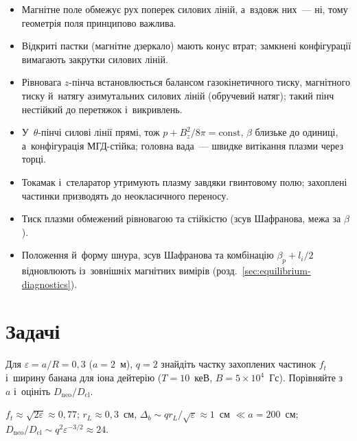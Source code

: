\begin{Summary}
\begin{itemize}
\item Магнітне поле обмежує рух поперек силових ліній, а~вздовж них~--- ні, тому геометрія поля принципово важлива.
\item Відкриті пастки (магнітне дзеркало) мають конус втрат; замкнені конфігурації вимагають закрутки силових ліній.
\item Рівновага $z$-пінча встановлюється балансом газокінетичного тиску, магнітного тиску й~натягу азимутальних силових ліній (обручевий натяг); такий пінч нестійкий до перетяжок і~викривлень.
\item У~$\theta$-пінчі силові лінії прямі, тож $p+B_z^2/8\pi=\mathrm{const}$, $\beta$ близьке до одиниці, а~конфігурація МГД-стійка; головна вада~--- швидке витікання плазми через торці.
\item Токамак і~стеларатор утримують плазму завдяки гвинтовому полю; захоплені частинки призводять до неокласичного переносу.
\item Тиск плазми обмежений рівновагою та стійкістю (зсув Шафранова, межа за $\beta$).
\item Положення й~форму шнура, зсув Шафранова та комбінацію $\beta_p+l_i/2$ відновлюють із~зовнішніх магнітних вимірів (розд.~\ref{sec:equilibrium-diagnostics}).
\end{itemize}
\end{Summary}

\section*{Задачі}

\begin{problem}\label{prb:BananaWidth}
	Для $\varepsilon=a/R=0{,}3$ ($a=2$~м), $q=2$ знайдіть частку захоплених частинок $f_t$ і~ширину банана
	для іона дейтерію ($T=10$~кеВ, $B=5\times10^4$~Гс). Порівняйте з~$a$ і~оцініть
	$D_\mathrm{neo}/D_\mathrm{cl}$.
	\begin{solution}
		$f_t\approx\sqrt{2\varepsilon}\approx0{,}77$; $r_L\approx0{,}3$~см, $\Delta_b\sim qr_L/\sqrt\varepsilon\approx1$~см $\ll a=200$~см;
	$D_\mathrm{neo}/D_\mathrm{cl}\sim q^2\varepsilon^{-3/2}\approx24$.
	\end{solution}
\end{problem}

